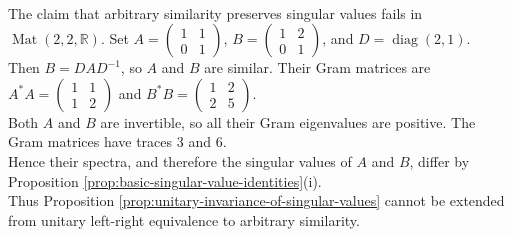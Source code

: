 \begin{counterexample} \label{cex:similarity-need-not-preserve-singular-values} \\
The claim that arbitrary similarity preserves singular values fails in $\operatorname{Mat}(2,2,\mathbb{R})$. Set $A=\left(\begin{smallmatrix}1&1\\0&1\end{smallmatrix}\right)$, $B=\left(\begin{smallmatrix}1&2\\0&1\end{smallmatrix}\right)$, and $D=\operatorname{diag}(2,1)$.\\
Then $B=DAD^{-1}$, so $A$ and $B$ are similar. Their Gram matrices are $A^*A=\left(\begin{smallmatrix}1&1\\1&2\end{smallmatrix}\right)$ and $B^*B=\left(\begin{smallmatrix}1&2\\2&5\end{smallmatrix}\right)$.\\
Both $A$ and $B$ are invertible, so all their Gram eigenvalues are positive. The Gram matrices have traces $3$ and $6$.\\
Hence their spectra, and therefore the singular values of $A$ and $B$, differ by Proposition \ref{prop:basic-singular-value-identities}(i).\\
Thus Proposition \ref{prop:unitary-invariance-of-singular-values} cannot be extended from unitary left-right equivalence to arbitrary similarity.
\end{counterexample}

